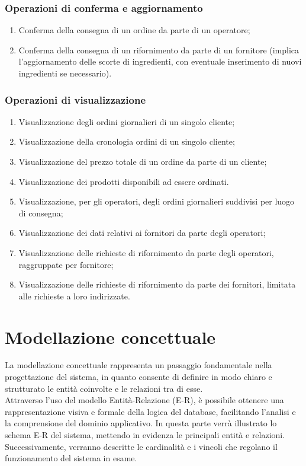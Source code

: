 \documentclass[12pt,a4paper]{article}
\begin{document}
    \subsubsection{Operazioni di conferma e aggiornamento}
    \begin{enumerate}[leftmargin=2.8em,label=\textbf{Op.\arabic*}]
        \item Conferma della consegna di un ordine da parte di un operatore;
        \item Conferma della consegna di un rifornimento da parte di un fornitore (implica l'aggiornamento delle scorte di ingredienti, con eventuale inserimento di nuovi ingredienti se necessario).
    \end{enumerate}

    \subsubsection{Operazioni di visualizzazione}
    \begin{enumerate}[leftmargin=2.8em,label=\textbf{Op.\arabic*}]
        \item Visualizzazione degli ordini giornalieri di un singolo cliente;
        \item Visualizzazione della cronologia ordini di un singolo cliente;
        \item Visualizzazione del prezzo totale di un ordine da parte di un cliente;
        \item Visualizzazione dei prodotti disponibili ad essere ordinati.
        \item Visualizzazione, per gli operatori, degli ordini giornalieri suddivisi per luogo di consegna;
        \item Visualizzazione dei dati relativi ai fornitori da parte degli operatori;
        \item Visualizzazione delle richieste di rifornimento da parte degli operatori, raggruppate per fornitore;
        \item Visualizzazione delle richieste di rifornimento da parte dei fornitori, limitata alle richieste a loro indirizzate.
    \end{enumerate}

    \newpage
    \section{Modellazione concettuale}
    La modellazione concettuale rappresenta un passaggio fondamentale nella progettazione del sistema, in quanto consente di definire in modo chiaro e strutturato le entità coinvolte e le relazioni tra di esse.\\
    Attraverso l'uso del modello Entità-Relazione (E-R), è possibile ottenere una rappresentazione visiva e formale della logica del database, facilitando l'analisi e la comprensione del dominio applicativo. In questa parte verrà illustrato lo schema E-R del sistema, mettendo in evidenza le principali entità e relazioni. Successivamente, verranno descritte le cardinalità e i vincoli che regolano il funzionamento del sistema in esame.
\end{document}
